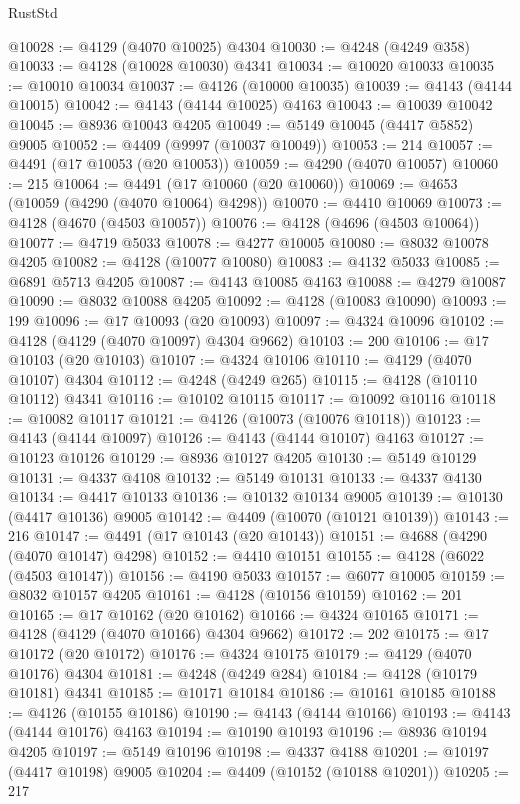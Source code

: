 \begin{lexlean}{RustStd}
\begin{coremodule}
@10028 := @4129 (@4070 @10025) @4304
@10030 := @4248 (@4249 @358)
@10033 := @4128 (@10028 @10030) @4341
@10034 := @10020 @10033
@10035 := @10010 @10034
@10037 := @4126 (@10000 @10035)
@10039 := @4143 (@4144 @10015)
@10042 := @4143 (@4144 @10025) @4163
@10043 := @10039 @10042
@10045 := @8936 @10043 @4205
@10049 := @5149 @10045 (@4417 @5852) @9005
@10052 := @4409 (@9997 (@10037 @10049))
@10053 := 214
@10057 := @4491 (@17 @10053 (@20 @10053))
@10059 := @4290 (@4070 @10057)
@10060 := 215
@10064 := @4491 (@17 @10060 (@20 @10060))
@10069 := @4653 (@10059 (@4290 (@4070 @10064) @4298))
@10070 := @4410 @10069
@10073 := @4128 (@4670 (@4503 @10057))
@10076 := @4128 (@4696 (@4503 @10064))
@10077 := @4719 @5033
@10078 := @4277 @10005
@10080 := @8032 @10078 @4205
@10082 := @4128 (@10077 @10080)
@10083 := @4132 @5033
@10085 := @6891 @5713 @4205
@10087 := @4143 @10085 @4163
@10088 := @4279 @10087
@10090 := @8032 @10088 @4205
@10092 := @4128 (@10083 @10090)
@10093 := 199
@10096 := @17 @10093 (@20 @10093)
@10097 := @4324 @10096
@10102 := @4128 (@4129 (@4070 @10097) @4304 @9662)
@10103 := 200
@10106 := @17 @10103 (@20 @10103)
@10107 := @4324 @10106
@10110 := @4129 (@4070 @10107) @4304
@10112 := @4248 (@4249 @265)
@10115 := @4128 (@10110 @10112) @4341
@10116 := @10102 @10115
@10117 := @10092 @10116
@10118 := @10082 @10117
@10121 := @4126 (@10073 (@10076 @10118))
@10123 := @4143 (@4144 @10097)
@10126 := @4143 (@4144 @10107) @4163
@10127 := @10123 @10126
@10129 := @8936 @10127 @4205
@10130 := @5149 @10129
@10131 := @4337 @4108
@10132 := @5149 @10131
@10133 := @4337 @4130
@10134 := @4417 @10133
@10136 := @10132 @10134 @9005
@10139 := @10130 (@4417 @10136) @9005
@10142 := @4409 (@10070 (@10121 @10139))
@10143 := 216
@10147 := @4491 (@17 @10143 (@20 @10143))
@10151 := @4688 (@4290 (@4070 @10147) @4298)
@10152 := @4410 @10151
@10155 := @4128 (@6022 (@4503 @10147))
@10156 := @4190 @5033
@10157 := @6077 @10005
@10159 := @8032 @10157 @4205
@10161 := @4128 (@10156 @10159)
@10162 := 201
@10165 := @17 @10162 (@20 @10162)
@10166 := @4324 @10165
@10171 := @4128 (@4129 (@4070 @10166) @4304 @9662)
@10172 := 202
@10175 := @17 @10172 (@20 @10172)
@10176 := @4324 @10175
@10179 := @4129 (@4070 @10176) @4304
@10181 := @4248 (@4249 @284)
@10184 := @4128 (@10179 @10181) @4341
@10185 := @10171 @10184
@10186 := @10161 @10185
@10188 := @4126 (@10155 @10186)
@10190 := @4143 (@4144 @10166)
@10193 := @4143 (@4144 @10176) @4163
@10194 := @10190 @10193
@10196 := @8936 @10194 @4205
@10197 := @5149 @10196
@10198 := @4337 @4188
@10201 := @10197 (@4417 @10198) @9005
@10204 := @4409 (@10152 (@10188 @10201))
@10205 := 217

\end{coremodule}
\end{lexlean}
